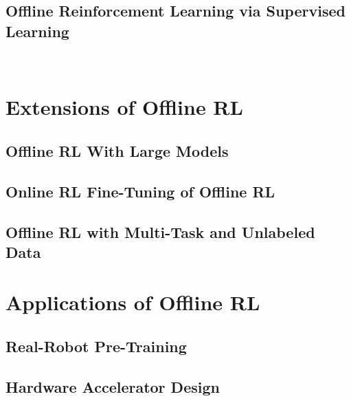 \documentclass[letterpaper,12pt, oneside]{lib/ucthesis}
\begin{document}
\begin{dissertationText}
\chapter{Offline Reinforcement Learning via Supervised Learning}~\label{chapter:rcp}
	

% 	

\part{Extensions of Offline RL}

\chapter{Offline RL With Large Models}
	

\chapter{Online RL Fine-Tuning of Offline RL}
	

\chapter{Offline RL with Multi-Task and Unlabeled Data}
	

\part{Applications of Offline RL}

\chapter{Real-Robot Pre-Training}
	

\chapter{Hardware Accelerator Design}
	

% 	


\end{dissertationText}
\end{document}
